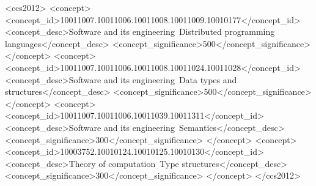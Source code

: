 \documentclass[acmlarge,anonymous]{acmart}\settopmatter{printfolios=true}
\begin{document}
\begin{CCSXML}
<ccs2012>
<concept>
<concept_id>10011007.10011006.10011008.10011009.10010177</concept_id>
<concept_desc>Software and its engineering~Distributed programming languages</concept_desc>
<concept_significance>500</concept_significance>
</concept>
<concept>
<concept_id>10011007.10011006.10011008.10011024.10011028</concept_id>
<concept_desc>Software and its engineering~Data types and structures</concept_desc>
<concept_significance>500</concept_significance>
</concept>
<concept>
<concept_id>10011007.10011006.10011039.10011311</concept_id>
<concept_desc>Software and its engineering~Semantics</concept_desc>
<concept_significance>300</concept_significance>
</concept>
<concept>
<concept_id>10003752.10010124.10010125.10010130</concept_id>
<concept_desc>Theory of computation~Type structures</concept_desc>
<concept_significance>300</concept_significance>
</concept>
</ccs2012>
\end{CCSXML}






\maketitle









\end{document}
